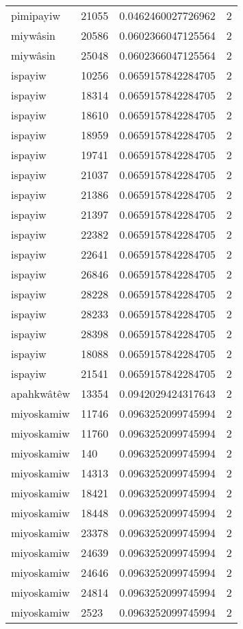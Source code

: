 \begin{longtable}{llll}
pimipayiw & 21055 & 0.0462460027726962 & 2 \\
miywâsin & 20586 & 0.0602366047125564 & 2 \\
miywâsin & 25048 & 0.0602366047125564 & 2 \\
ispayiw & 10256 & 0.0659157842284705 & 2 \\
ispayiw & 18314 & 0.0659157842284705 & 2 \\
ispayiw & 18610 & 0.0659157842284705 & 2 \\
ispayiw & 18959 & 0.0659157842284705 & 2 \\
ispayiw & 19741 & 0.0659157842284705 & 2 \\
ispayiw & 21037 & 0.0659157842284705 & 2 \\
ispayiw & 21386 & 0.0659157842284705 & 2 \\
ispayiw & 21397 & 0.0659157842284705 & 2 \\
ispayiw & 22382 & 0.0659157842284705 & 2 \\
ispayiw & 22641 & 0.0659157842284705 & 2 \\
ispayiw & 26846 & 0.0659157842284705 & 2 \\
ispayiw & 28228 & 0.0659157842284705 & 2 \\
ispayiw & 28233 & 0.0659157842284705 & 2 \\
ispayiw & 28398 & 0.0659157842284705 & 2 \\
ispayiw & 18088 & 0.0659157842284705 & 2 \\
ispayiw & 21541 & 0.0659157842284705 & 2 \\
apahkwâtêw & 13354 & 0.0942029424317643 & 2 \\
miyoskamiw & 11746 & 0.0963252099745994 & 2 \\
miyoskamiw & 11760 & 0.0963252099745994 & 2 \\
miyoskamiw & 140 & 0.0963252099745994 & 2 \\
miyoskamiw & 14313 & 0.0963252099745994 & 2 \\
miyoskamiw & 18421 & 0.0963252099745994 & 2 \\
miyoskamiw & 18448 & 0.0963252099745994 & 2 \\
miyoskamiw & 23378 & 0.0963252099745994 & 2 \\
miyoskamiw & 24639 & 0.0963252099745994 & 2 \\
miyoskamiw & 24646 & 0.0963252099745994 & 2 \\
miyoskamiw & 24814 & 0.0963252099745994 & 2 \\
miyoskamiw & 2523 & 0.0963252099745994 & 2 \\

\end{longtable}
